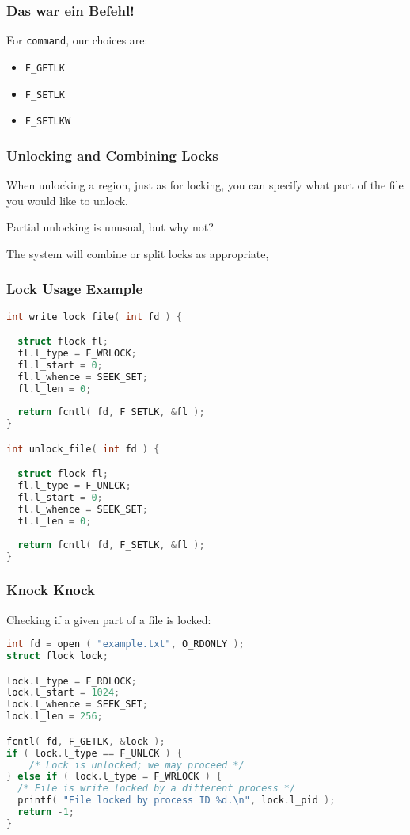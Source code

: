 \begin{frame}
	\frametitle{Das war ein Befehl!}

	For \texttt{command}, our choices are:
	\begin{itemize}
		\item \texttt{F\_GETLK}
		\item \texttt{F\_SETLK}
		\item \texttt{F\_SETLKW}
	\end{itemize}

\end{frame}


\begin{frame}
	\frametitle{Unlocking and Combining Locks}

	When unlocking a region, just as for locking, you can specify what part of the file you would like to unlock.

	Partial unlocking is unusual, but why not?

	The system will combine or split locks as appropriate,


\end{frame}

\begin{frame}[fragile]
	\frametitle{Lock Usage Example}

	\begin{lstlisting}[language=C]
int write_lock_file( int fd ) {

  struct flock fl;
  fl.l_type = F_WRLOCK;
  fl.l_start = 0;
  fl.l_whence = SEEK_SET;
  fl.l_len = 0;
  
  return fcntl( fd, F_SETLK, &fl );
}

int unlock_file( int fd ) {

  struct flock fl;
  fl.l_type = F_UNLCK;
  fl.l_start = 0;
  fl.l_whence = SEEK_SET;
  fl.l_len = 0;
  
  return fcntl( fd, F_SETLK, &fl );
}
\end{lstlisting}


\end{frame}

\begin{frame}[fragile]
	\frametitle{Knock Knock}

	Checking if a given part of a file is locked:


	\begin{lstlisting}[language=C]
int fd = open ( "example.txt", O_RDONLY );
struct flock lock;

lock.l_type = F_RDLOCK;
lock.l_start = 1024;
lock.l_whence = SEEK_SET;
lock.l_len = 256;

fcntl( fd, F_GETLK, &lock );
if ( lock.l_type == F_UNLCK ) {
	/* Lock is unlocked; we may proceed */
} else if ( lock.l_type = F_WRLOCK ) {
  /* File is write locked by a different process */
  printf( "File locked by process ID %d.\n", lock.l_pid );
  return -1;
}
\end{lstlisting}

\end{frame}

